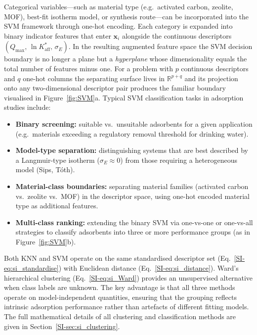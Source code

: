 \documentclass[journal=jacsat,manuscript=article]{achemso}
\begin{document}
	Categorical variables---such as material type (e.g.\ activated carbon, zeolite, MOF), best-fit isotherm model, or synthesis route---can be incorporated into the SVM framework through one-hot encoding. Each category is expanded into binary indicator features that enter $\mathbf{x}_i$ alongside the continuous descriptors $(Q_{\max},\, \ln K_{\mathrm{aff}}^{\ast},\, \sigma_E)$. In the resulting augmented feature space the SVM decision boundary is no longer a plane but a \emph{hyperplane} whose dimensionality equals the total number of features minus one. For a problem with $p$ continuous descriptors and $q$ one-hot columns the separating surface lives in $\mathbb{R}^{p+q}$ and its projection onto any two-dimensional descriptor pair produces the familiar boundary visualised in Figure~\ref{fig:SVM}a. Typical SVM classification tasks in adsorption studies include:
	\begin{itemize}
		\item \textbf{Binary screening:} suitable vs.\ unsuitable adsorbents for a given application (e.g.\ materials exceeding a regulatory removal threshold for drinking water).
		\item \textbf{Model-type separation:} distinguishing systems that are best described by a Langmuir-type isotherm ($\sigma_E \approx 0$) from those requiring a heterogeneous model (Sips, T\'{o}th).
		\item \textbf{Material-class boundaries:} separating material families (activated carbon vs.\ zeolite vs.\ MOF) in the descriptor space, using one-hot encoded material type as additional features.
		\item \textbf{Multi-class ranking:} extending the binary SVM via one-vs-one or one-vs-all strategies to classify adsorbents into three or more performance groups (as in Figure~\ref{fig:SVM}b).
	\end{itemize}

	Both KNN and SVM operate on the same standardised descriptor set (Eq.~\ref{SI-eq:si_standardise}) with Euclidean distance (Eq.~\ref{SI-eq:si_distance}). Ward's hierarchical clustering (Eq.~\ref{SI-eq:si_Ward}) provides an unsupervised alternative when class labels are unknown. The key advantage is that all three methods operate on model-independent quantities, ensuring that the grouping reflects intrinsic adsorption performance rather than artefacts of different fitting models. The full mathematical details of all clustering and classification methods are given in Section~\ref{SI-sec:si_clustering}.
\end{document}
